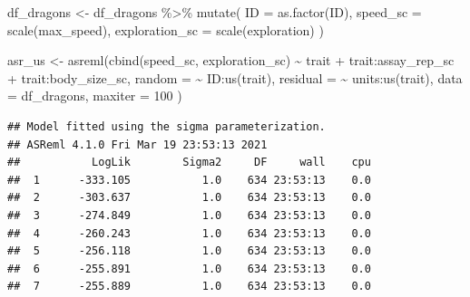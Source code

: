 \documentclass[
  12pt,
]{book}
\newenvironment{Shaded}{\begin{snugshade}}{\end{snugshade}}
\newcommand{\AttributeTok}[1]{\textcolor[rgb]{0.77,0.63,0.00}{#1}}
\newcommand{\DecValTok}[1]{\textcolor[rgb]{0.00,0.00,0.81}{#1}}
\newcommand{\FunctionTok}[1]{\textcolor[rgb]{0.00,0.00,0.00}{#1}}
\newcommand{\NormalTok}[1]{#1}
\newcommand{\OtherTok}[1]{\textcolor[rgb]{0.56,0.35,0.01}{#1}}
\newcommand{\SpecialCharTok}[1]{\textcolor[rgb]{0.00,0.00,0.00}{#1}}
\begin{document}
\begin{Shaded}
\begin{Highlighting}[]
\NormalTok{df\_dragons }\OtherTok{\textless{}{-}}\NormalTok{ df\_dragons }\SpecialCharTok{\%\textgreater{}\%}
  \FunctionTok{mutate}\NormalTok{(}
    \AttributeTok{ID =} \FunctionTok{as.factor}\NormalTok{(ID),}
    \AttributeTok{speed\_sc =} \FunctionTok{scale}\NormalTok{(max\_speed),}
    \AttributeTok{exploration\_sc =} \FunctionTok{scale}\NormalTok{(exploration)}
\NormalTok{  )}

\NormalTok{asr\_us }\OtherTok{\textless{}{-}} \FunctionTok{asreml}\NormalTok{(}\FunctionTok{cbind}\NormalTok{(speed\_sc, exploration\_sc) }\SpecialCharTok{\textasciitilde{}}\NormalTok{ trait }\SpecialCharTok{+}
\NormalTok{  trait}\SpecialCharTok{:}\NormalTok{assay\_rep\_sc }\SpecialCharTok{+}\NormalTok{ trait}\SpecialCharTok{:}\NormalTok{body\_size\_sc,}
\AttributeTok{random =} \SpecialCharTok{\textasciitilde{}}\NormalTok{ ID}\SpecialCharTok{:}\FunctionTok{us}\NormalTok{(trait),}
\AttributeTok{residual =} \SpecialCharTok{\textasciitilde{}}\NormalTok{ units}\SpecialCharTok{:}\FunctionTok{us}\NormalTok{(trait),}
\AttributeTok{data =}\NormalTok{ df\_dragons,}
\AttributeTok{maxiter =} \DecValTok{100}
\NormalTok{)}
\end{Highlighting}
\end{Shaded}

\begin{verbatim}
## Model fitted using the sigma parameterization.
## ASReml 4.1.0 Fri Mar 19 23:53:13 2021
##           LogLik        Sigma2     DF     wall    cpu
##  1      -333.105           1.0    634 23:53:13    0.0
##  2      -303.637           1.0    634 23:53:13    0.0
##  3      -274.849           1.0    634 23:53:13    0.0
##  4      -260.243           1.0    634 23:53:13    0.0
##  5      -256.118           1.0    634 23:53:13    0.0
##  6      -255.891           1.0    634 23:53:13    0.0
##  7      -255.889           1.0    634 23:53:13    0.0
\end{verbatim}
\end{document}
